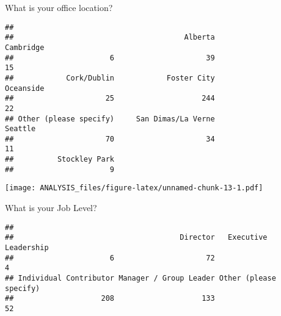 \documentclass[]{article}
\newenvironment{Shaded}{\begin{snugshade}}{\end{snugshade}}
\newcommand{\KeywordTok}[1]{\textcolor[rgb]{0.13,0.29,0.53}{\textbf{#1}}}
\newcommand{\DataTypeTok}[1]{\textcolor[rgb]{0.13,0.29,0.53}{#1}}
\newcommand{\DecValTok}[1]{\textcolor[rgb]{0.00,0.00,0.81}{#1}}
\newcommand{\FloatTok}[1]{\textcolor[rgb]{0.00,0.00,0.81}{#1}}
\newcommand{\StringTok}[1]{\textcolor[rgb]{0.31,0.60,0.02}{#1}}
\newcommand{\OperatorTok}[1]{\textcolor[rgb]{0.81,0.36,0.00}{\textbf{#1}}}
\newcommand{\NormalTok}[1]{#1}
\begin{document}
What is your office location?

\begin{Shaded}
\end{Shaded}

\begin{verbatim}
## 
##                                       Alberta              Cambridge 
##                      6                     39                     15 
##            Cork/Dublin            Foster City              Oceanside 
##                     25                    244                     22 
## Other (please specify)     San Dimas/La Verne                Seattle 
##                     70                     34                     11 
##          Stockley Park 
##                      9
\end{verbatim}

\begin{Shaded}
\end{Shaded}

\texttt{[image: ANALYSIS\_files/figure-latex/unnamed-chunk-13-1.pdf]}

What is your Job Level?

\begin{Shaded}
\end{Shaded}

\begin{verbatim}
## 
##                                      Director   Executive Leadership 
##                      6                     72                      4 
## Individual Contributor Manager / Group Leader Other (please specify) 
##                    208                    133                     52
\end{verbatim}
\end{document}
